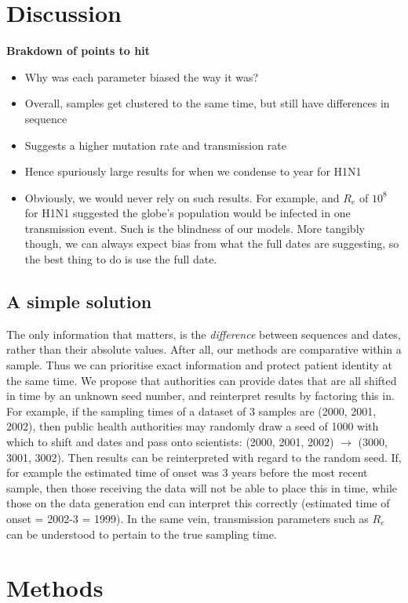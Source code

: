 \documentclass{article}
\begin{document}
\begin{spacing}{1.5}
\section*{Discussion}
\textbf{Brakdown of points to hit}
\begin{itemize}
    \item Why was each parameter biased the way it was?
    \item Overall, samples get clustered to the same time, but still have differences in sequence
    \item Suggests a higher mutation rate and transmission rate
    \item Hence spuriously large results for when we condense to year for H1N1
    \item Obviously, we would never rely on such results. For example, and $R_e$ of $10^8$ for H1N1 suggested the globe's population would be infected in one transmission event. Such is the blindness of our models. More tangibly though, we can always expect bias from what the full dates are suggesting, so the best thing to do is use the full date.
\end{itemize}
\subsection*{A simple solution}
The only information that matters, is the \emph{difference} between sequences and dates, rather than their absolute values. After all, our methods are comparative within a sample. Thus we can prioritise exact information and protect patient identity at the same time. We propose that authorities can provide dates that are all shifted in time by an unknown seed number, and reinterpret results by factoring this in. For example, if the sampling times of a dataset of 3 samples are (2000, 2001, 2002), then public health authorities may randomly draw a seed of 1000 with which to shift and dates and pass onto scientists: (2000, 2001, 2002) $\rightarrow$ (3000, 3001, 3002). Then results can be reinterpreted with regard to the random seed. If, for example the estimated time of onset was 3 years before the most recent sample, then those receiving the data will not be able to place this in time, while those on the data generation end can interpret this correctly (estimated time of onset = 2002-3 = 1999). In the same vein, transmission parameters such as $R_e$ can be understood to pertain to the true sampling time.


\section*{Methods}

\end{spacing}



\end{document}
